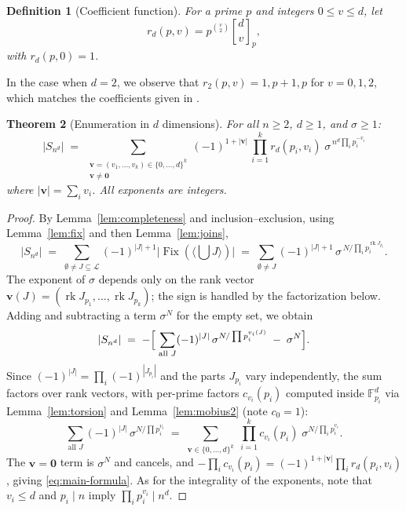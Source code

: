 \documentclass[11pt,a4paper]{article}
\newtheorem{theorem}{Theorem}[section]
\newtheorem{definition}[theorem]{Definition}
\theoremstyle{remark}
\DeclareMathOperator{\Fix}{Fix}
\DeclareMathOperator{\rk}{rk}
\newcommand{\FF}{\mathbb{F}}
\newcommand{\vv}{\mathbf{v}}
\newcommand{\gaussbinom}[2]{\genfrac{[}{]}{0pt}{}{#1}{#2}}
\begin{document}
\begin{definition}[Coefficient function]\label{def:coef}
For a prime $p$ and integers $0\le v\le d$, let
\[r_d(p,v)=p^{\binom v2}\gaussbinom dv_p,\] with $r_d(p,0)=1$. 
\end{definition}

    In the case when $d=2$, we observe that $r_2(p,v)=1, p+1, p$ for $v=0,1,2$, which matches the coefficients given in \cite[Thm.~E.19]{banda2019}.

\begin{theorem}[Enumeration in $d$ dimensions]\label{thm:main-enum}
For all $n\ge2$, $d\ge1$, and $\sigma\ge1$:
\begin{equation}\label{eq:main-formula}
    \boxed{\;|S_{n^d}| \;=\; \sum_{\substack{\vv=(v_1,\dots,v_k)\in
    \{0,\dots,d\}^k\\ \vv\neq\mathbf 0}}
    (-1)^{1+|\vv|}\,\prod_{i=1}^{k} r_d(p_i, v_i)\;
    \sigma^{\,n^d\prod_i p_i^{-v_i}}\;}
\end{equation}
where $|\vv|=\sum_i v_i$. All exponents are integers.
\end{theorem}

\begin{proof}
By Lemma~\ref{lem:completeness} and inclusion--exclusion, using
Lemma~\ref{lem:fix} and then Lemma~\ref{lem:joins},
\[
  |S_{n^d}| \;=\; \sum_{\emptyset\neq J\subseteq\mathcal L}(-1)^{|J|+1}
  \bigl|\Fix(\langle\textstyle\bigcup J\rangle)\bigr|
  \;=\; \sum_{\emptyset\neq J}(-1)^{|J|+1}\,
  \sigma^{\,N/\prod_i p_i^{\rk J_{p_i}}} .
\]
The exponent of $\sigma$ depends only on the rank vector
$\vv(J)=(\rk J_{p_1},\dots,\rk J_{p_k})$; the sign is handled by the
factorization below. Adding and subtracting a term $\sigma^N$ for the empty set, we obtain
\[
  |S_{n^d}| \;=\; -\Bigl[\;\sum_{\text{all }J}(-1)^{|J|}\,
  \sigma^{N/\prod p_i^{v_i(J)}} \;-\;\sigma^{N}\Bigr].
\]
Since $(-1)^{|J|}=\prod_i(-1)^{|J_{p_i}|}$ and the parts $J_{p_i}$ vary
independently, the sum factors over rank vectors, with per-prime factors
$c_{v_i}(p_i)$ computed inside $\FF_{p_i}^d$ via Lemma~\ref{lem:torsion}
and Lemma~\ref{lem:mobius2} (note $c_0=1$):
\[
  \sum_{\text{all }J}(-1)^{|J|}\,\sigma^{N/\prod p_i^{v_i}}
  \;=\;\sum_{\vv\in\{0,\dots,d\}^k}\;\prod_{i=1}^k c_{v_i}(p_i)\;
  \sigma^{N/\prod_i p_i^{v_i}} .
\]
The $\vv=\mathbf 0$ term is $\sigma^N$ and cancels, and
$-\prod_i c_{v_i}(p_i)=(-1)^{1+|\vv|}\prod_i r_d(p_i,v_i)$, giving
\eqref{eq:main-formula}. As for the integrality of the exponents, note that $v_i\le d$ and $p_i\mid n$ imply
$\prod_i p_i^{v_i}\mid n^d$.
\end{proof}
\end{document}
